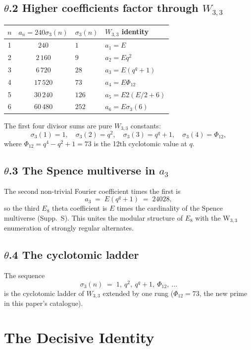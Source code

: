 \documentclass[12pt,a4paper]{article}
\def\Phi#1{Phi#1}%
\def\cdot{ }%
\theoremstyle{definition}
\begin{document}
\subsection*{$\theta$.2 \quad Higher coefficients factor through $W_{3,3}$}
\begin{center}
\renewcommand{\arraystretch}{1.4}
\begin{tabular}{ccll}
\toprule
$n$ & $a_n = 240\sigma_3(n)$ & $\sigma_3(n)$ & $W_{3,3}$ identity \\
\midrule
1 & $240$ & $1$ & $a_1 = E$ \\
2 & $2\,160$ & $9$ & $a_2 = E\cdot q^2$ \\
3 & $6\,720$ & $28$ & $a_3 = E\cdot(q^q+1)$ \\
4 & $17\,520$ & $73$ & $a_4 = E\cdot\Phi_{12}$ \\
5 & $30\,240$ & $126$ & $a_5 = E\cdot 2(E/2 + 6)$ \\
6 & $60\,480$ & $252$ & $a_6 = E\cdot\sigma_3(6)$ \\
\bottomrule
\end{tabular}
\end{center}
The first four divisor sums are pure $W_{3,3}$ constants:
\[
\sigma_3(1) = 1,\quad
\sigma_3(2) = q^2,\quad
\sigma_3(3) = q^q + 1,\quad
\sigma_3(4) = \Phi_{12},
\]
where $\Phi_{12} = q^4 - q^2 + 1 = 73$ is the 12th cyclotomic value
at $q$.

\subsection*{$\theta$.3 \quad The Spence multiverse in $a_3$}
The second non-trivial Fourier coefficient times the first is
\[
a_3 \;=\; E\cdot(q^q+1) \;=\; 240\cdot 28,
\]
so the third $E_8$ theta coefficient is $E$ times the cardinality of
the Spence multiverse (Supp.~S). This unites the modular structure of
$E_8$ with the W$_{3,3}$ enumeration of strongly regular alternates.

\subsection*{$\theta$.4 \quad The cyclotomic ladder}
The sequence
\[
\sigma_3(n) \;=\; 1,\ q^2,\ q^q+1,\ \Phi_{12},\ \ldots
\]
is the cyclotomic ladder of $W_{3,3}$ extended by one rung
($\Phi_{12} = 73$, the new prime in this paper's catalogue).

\section*{The Decisive Identity}
\end{document}
